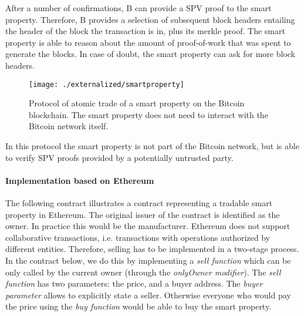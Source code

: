 After a number of confirmations, B can provide a SPV proof to the smart property. Therefore, B provides a selection of subsequent block headers entailing the header of the block the transaction is in, plus its merkle proof. The smart property is able to reason about the amount of proof-of-work that was spent to generate the blocks. In case of doubt, the smart property can ask for more block headers.

\begin{figure}[!t]
    \centering
    \texttt{[image: ./externalized/smartproperty]}
    \caption{Protocol of atomic trade of a smart property on the Bitcoin blockchain. The smart property does not need to interact with the Bitcoin network itself.}
    \label{fig:smartproperty}
  \end{figure}

In this protocol the smart property is not part of the Bitcoin network, but is able to verify SPV proofs provided by a potentially untrusted party. 

\paragraph{Implementation based on Ethereum}

The following contract illustrates a contract representing a tradable smart property in Ethereum. The original issuer of the contract is identified as the owner. In practice this would be the manufacturer. Ethereum does not support collaborative transactions, i.e. transactions with operations authorized by different entities. Therefore, selling has to be implemented in a two-stage process. In the contract below, we do this by implementing a \emph{sell function} which can be only called by the current owner (through the \emph{onlyOwner modifier}). The \emph{sell function} has two parameters: the price, and a buyer address. The \emph{buyer parameter} allows to explicitly state a seller. Otherwise everyone who would pay the price using the \emph{buy function} would be able to buy the smart property.

